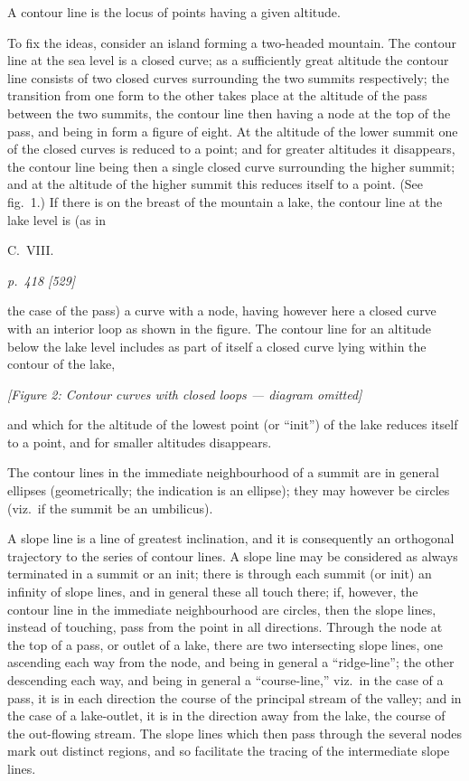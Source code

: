 \documentclass[11pt,a4paper]{article}
\theoremstyle{plain}
\theoremstyle{definition}
\begin{document}
A contour line is the locus of points having a given altitude.

To fix the ideas, consider an island forming a two-headed mountain. The contour line at the sea level is a closed curve; as a sufficiently great altitude the contour line consists of two closed curves surrounding the two summits respectively; the transition from one form to the other takes place at the altitude of the pass between the two summits, the contour line then having a node at the top of the pass, and being in form a figure of eight. At the altitude of the lower summit one of the closed curves is reduced to a point; and for greater altitudes it disappears, the contour line being then a single closed curve surrounding the higher summit; and at the altitude of the higher summit this reduces itself to a point. (See fig.~1.) If there is on the breast of the mountain a lake, the contour line at the lake level is (as in

\bigskip
\hfill{\small C.\ VIII.}

\clearpage

\bigskip
\textit{p.~418 [529]}
\smallskip

the case of the pass) a curve with a node, having however here a closed curve with an interior loop as shown in the figure. The contour line for an altitude below the lake level includes as part of itself a closed curve lying within the contour of the lake,

\begin{center}
\textit{[Figure 2: Contour curves with closed loops --- diagram omitted]}
\end{center}

\noindent
and which for the altitude of the lowest point (or ``init'') of the lake reduces itself to a point, and for smaller altitudes disappears.

The contour lines in the immediate neighbourhood of a summit are in general ellipses (geometrically; the indication is an ellipse); they may however be circles (viz.\ if the summit be an umbilicus).

A slope line is a line of greatest inclination, and it is consequently an orthogonal trajectory to the series of contour lines. A slope line may be considered as always terminated in a summit or an init; there is through each summit (or init) an infinity of slope lines, and in general these all touch there; if, however, the contour line in the immediate neighbourhood are circles, then the slope lines, instead of touching, pass from the point in all directions. Through the node at the top of a pass, or outlet of a lake, there are two intersecting slope lines, one ascending each way from the node, and being in general a ``ridge-line''; the other descending each way, and being in general a ``course-line,'' viz.\ in the case of a pass, it is in each direction the course of the principal stream of the valley; and in the case of a lake-outlet, it is in the direction away from the lake, the course of the out-flowing stream. The slope lines which then pass through the several nodes mark out distinct regions, and so facilitate the tracing of the intermediate slope lines.
\end{document}
